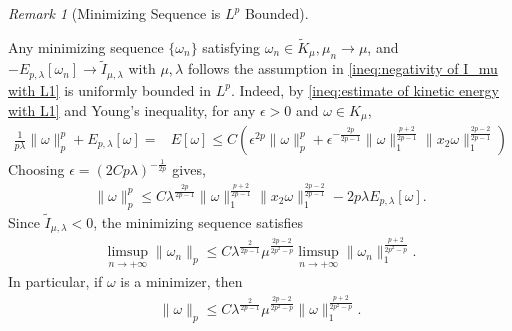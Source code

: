 \documentclass[11pt,letterpaper]{amsart}
\theoremstyle{definition}
\theoremstyle{remark}
\newtheorem{remark}[thm]{Remark}
\newcommand{\eps}{\epsilon}
\numberwithin{equation}{section}
\begin{document}
\rightline{$\Box$}

\begin{remark}[Minimizing Sequence is $L^p$ Bounded]\label{remark:uniformly bounded with L1}
\end{remark}
    Any minimizing sequence $\{\omega_n\}$ satisfying $\omega_n\in \widetilde{K}_{\mu}, \mu_n\rightarrow \mu$, and $-E_{p,\lambda}[\omega_n]\rightarrow \widetilde{I}_{\mu,\lambda}$ with $\mu, \lambda$ follows the assumption in \eqref{ineq:negativity of I_mu with L1} is uniformly bounded in $L^p$. Indeed, by \eqref{ineq:estimate of kinetic energy with L1} and Young’s inequality, for any $\epsilon >0 $ and $\omega\in K_\mu$,
    \begin{align*}
        \frac{1}{p\lambda}\|\omega\|_{p}^p+E_{p,\lambda}[\omega]
        = & E[\omega] \leq C\left(\eps^{2p}\|\omega\|_p^p + \eps^{-\frac{2p}{2p-1}}\|\omega\|_1^{\frac{p+2}{2p-1}}\|x_2\omega\|_1^{\frac{2p-2}{2p-1}}\right)
    \end{align*}
    Choosing $\eps=(2Cp\lambda)^{-\frac{1}{2p}}$ gives, 
    \begin{align*}
        \|\omega\|_{p}^p\leq C\lambda^{\frac{2p}{2p-1}}\|\omega\|_1^{\frac{p+2}{2p-1}}\|x_2\omega\|_1^{\frac{2p-2}{2p-1}}-2p\lambda E_{p,\lambda}[\omega].
    \end{align*}
    Since $\widetilde{I}_{\mu,\lambda}<0$, the minimizing sequence satisfies 
    \begin{align*}
        \limsup_{n\rightarrow +\infty}\|\omega_n\|_{p}\leq C\lambda^{\frac{2}{2p-1}}\mu^{\frac{2p-2}{2p^2-p}}\limsup_{n\rightarrow +\infty}\|\omega_n\|_1^{\frac{p+2}{2p^2-p}}. 
    \end{align*}
    In particular, if $\omega$ is a minimizer, then 
    \begin{align}
        \|\omega\|_{p}\leq C\lambda^{\frac{2}{2p-1}}\mu^{\frac{2p-2}{2p^2-p}}\|\omega\|_1^{\frac{p+2}{2p^2-p}}. \label{ineq:uniformly bounded with L1}
    \end{align}

\end{document}
